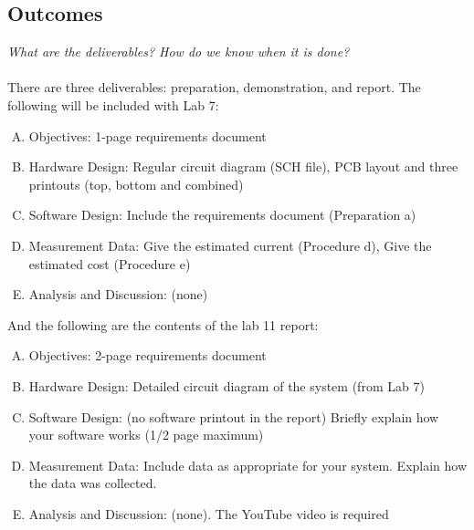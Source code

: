 \documentclass{article}
\begin{document}
\subsection{Outcomes}
\textit{What are the deliverables? How do we know when it is done?}\\ \\
There are three deliverables: preparation, demonstration, and report. The following will be included with Lab 7:
\begin{enumerate}[A)]
\item Objectives: 1-page requirements document
\item Hardware Design: Regular circuit diagram (SCH file), PCB layout and three printouts (top, bottom and combined) 
\item Software Design: Include the requirements document (Preparation a)
\item Measurement Data: Give the estimated current (Procedure d), Give the estimated cost (Procedure e)
\item Analysis and Discussion: (none)\\
\end{enumerate}

And the following are the contents of the lab 11 report:
\begin{enumerate}[A)]
\item Objectives: 2-page requirements document
\item Hardware Design: Detailed circuit diagram of the system (from Lab 7)
\item Software Design: (no software printout in the report) Briefly explain how your software works (1/2 page maximum)
\item Measurement Data: Include data as appropriate for your system. Explain how the data was collected.
\item Analysis and Discussion: (none). The YouTube video is required
\end{enumerate}
\end{document}
